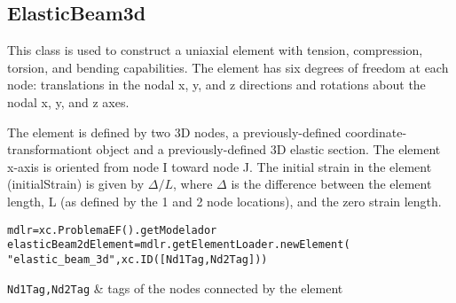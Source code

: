 \begin{methodsTable}
\ElementMeth{} 
\ElementOneDMeth{}
\end{methodsTable}

\subsection{ElasticBeam3d}
This class is used to construct a uniaxial element with tension, compression, torsion, and bending capabilities. The element has six degrees of freedom at each node: translations in the nodal x, y, and z directions and rotations about the nodal x, y, and z axes. 

The element is defined by two 3D nodes, a previously-defined coordinate-transformationt object and a previously-defined 3D elastic section. The element x-axis is oriented from node I toward node J. The initial strain in the element (initialStrain) is given by $\Delta/L$, where $\Delta$ is the difference between the element length, L (as defined by the 1 and 2 node locations), and the zero strain length. 

\begin{verbatim}
mdlr=xc.ProblemaEF().getModelador
elasticBeam2dElement=mdlr.getElementLoader.newElement(
"elastic_beam_3d",xc.ID([Nd1Tag,Nd2Tag]))
\end{verbatim}
\begin{paramFuncTable}
{\tt Nd1Tag,Nd2Tag} & tags of the nodes connected by the element\\
\end{paramFuncTable}


\begin{paramClassTable}
\ElementParam{}
\ElementOneDParam{}
\ProtoBeamThreeDParam{}
\rhoX{} \\
\initialStrain{} \\
\getANTwo{} \\
\getNOne{} \\
\getNTwo{} \\
\getN{} \\
\getAMzOne{} \\
\getAMzTwo{} \\
\getMzOne{} \\
\getMzTwo{} \\
\getMyOne{} \\
\getMyTwo{} \\
\getVy{} \\
\getVyOne{} \\
\getVyTwo{} \\
\getAVyOne{} \\
\getAVyTwo{} \\
\getVz{} \\
\getVzOne{} \\
\getVzTwo{} \\
\getAVzOne{} \\
\getAVzTwo{} \\
\end{paramClassTable}

